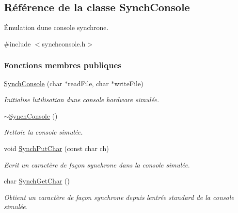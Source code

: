 \hypertarget{class_synch_console}{}\subsection{Référence de la classe Synch\+Console}
\label{class_synch_console}


Émulation d\textquotesingle{}une console synchrone.  




{\ttfamily \#include $<$synchconsole.\+h$>$}

\subsubsection*{Fonctions membres publiques}
\begin{DoxyCompactItemize}
\item 
\hyperlink{class_synch_console_a888915fb5c11051308853603ccf0e436}{Synch\+Console} (char $\ast$read\+File, char $\ast$write\+File)
\begin{DoxyCompactList}\small\item\em Initialise l\textquotesingle{}utilisation d\textquotesingle{}une console hardware simulée. \end{DoxyCompactList}\item 
\hypertarget{class_synch_console_a0d2354246920f69af7d316a11820b385}{}\label{class_synch_console_a0d2354246920f69af7d316a11820b385} 
\hyperlink{class_synch_console_a0d2354246920f69af7d316a11820b385}{$\sim$\+Synch\+Console} ()
\begin{DoxyCompactList}\small\item\em Nettoie la console simulée. \end{DoxyCompactList}\item 
void \hyperlink{class_synch_console_a20b9d14d9173609f843d926e18fdd8ac}{Synch\+Put\+Char} (const char ch)
\begin{DoxyCompactList}\small\item\em Ecrit un caractère de façon synchrone dans la console simulée. \end{DoxyCompactList}\item 
char \hyperlink{class_synch_console_a005ecd5d135d4b7faf9cfa27aa9792a1}{Synch\+Get\+Char} ()
\begin{DoxyCompactList}\small\item\em Obtient un caractère de façon synchrone depuis l\textquotesingle{}entrée standard de la console simulée. \end{DoxyCompactList}\item 

\end{DoxyCompactItemize}
